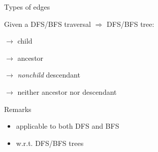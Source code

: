 \begin{frame}{Types of edges}
  \begin{definition}
    Given a DFS/BFS traversal $\Rightarrow$ DFS/BFS tree:
	\begin{description}
	  \item[Tree edge:] $\to$ child
	  \item[Back edge:] $\to$ ancestor
	  \item[Forward edge:] $\to$ \emph{nonchild} descendant
	  \item[Cross edge:] $\to$ neither ancestor nor descendant
    \end{description}
  \end{definition}

  \pause
  \begin{alertblock}{Remarks}
    \begin{itemize}
      \item applicable to both DFS and BFS
      \item w.r.t. DFS/BFS trees
    \end{itemize}
  \end{alertblock}
\end{frame}

